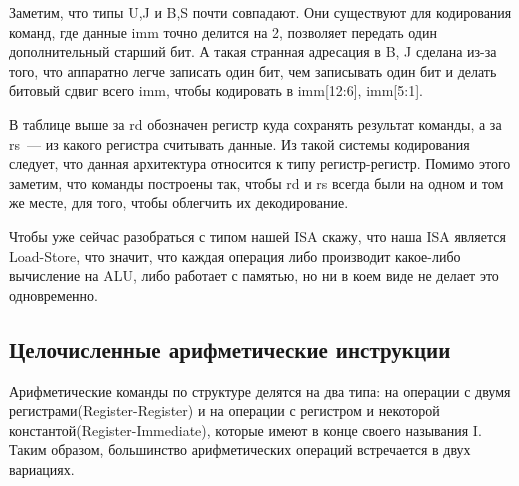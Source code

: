 \documentclass[14pt, russian, onesize]{extreport}
\begin{document}
Заметим, что типы U,J и B,S почти совпадают. Они существуют для кодирования
команд, где данные imm точно делится на 2, позволяет передать один
дополнительный старший бит. А такая странная адресация в B, J сделана
из-за того, что аппаратно легче записать один бит, чем записывать
один бит и делать битовый сдвиг всего imm, чтобы кодировать в imm[12:6], imm[5:1].

В таблице выше за rd обозначен регистр
куда сохранять результат команды, а за rs~--- из какого регистра считывать данные.
Из такой системы  кодирования следует,
что данная архитектура относится к типу регистр-регистр. 
Помимо этого заметим, что команды построены так, чтобы rd и rs всегда
были на одном и том же месте, для того, чтобы облегчить их декодирование.

Чтобы уже сейчас разобраться с типом нашей ISA скажу, что наша ISA 
является Load-Store, что значит, что каждая операция либо производит
какое-либо вычисление на ALU, либо работает с памятью, но ни в коем
виде не делает это одновременно.

\subsection*{Целочисленные арифметические инструкции}
Арифметические команды по структуре делятся на два типа: на операции
с двумя регистрами(Register-Register) и на операции с регистром и некоторой 
константой(Register-Immediate), которые имеют в конце своего называния I. Таким 
образом, большинство арифметических операций встречается в двух вариациях. 
\end{document}
